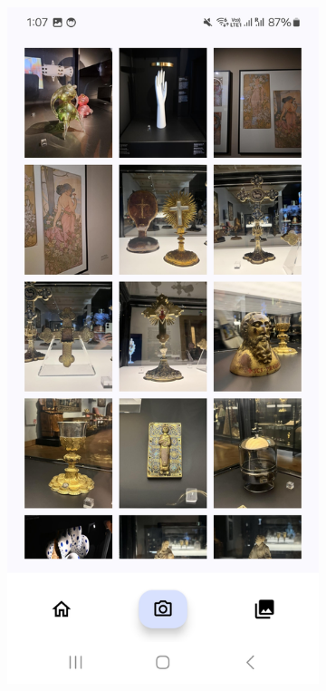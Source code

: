 \begin{figure}[h]
    \vspace{1em}

    \begin{subfigure}[b]{0.3\textwidth}
        \centering
        \includegraphics[width=\textwidth]{img/gallery-screen.jpg}

\end{subfigure}
\end{figure}
